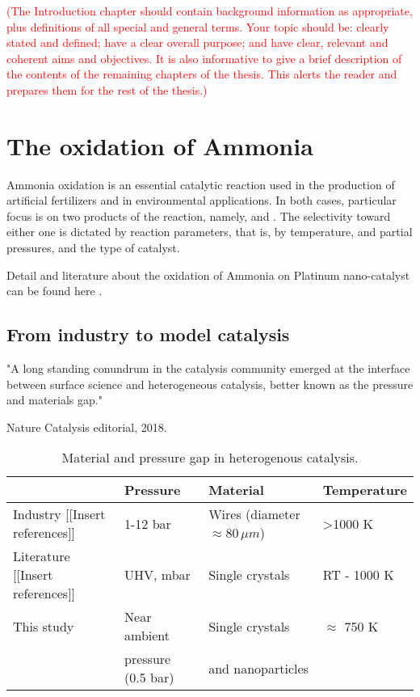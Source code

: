 \textcolor{red}{(The Introduction chapter should contain background information as appropriate, plus definitions of all special and general terms. Your topic should be: clearly stated and defined; have a clear overall purpose; and have clear, relevant and coherent aims and objectives. It is also informative to give a brief description of the contents of the remaining chapters of the thesis. This alerts the reader and prepares them for the rest of the thesis.)}

\section{The oxidation of Ammonia}

Ammonia oxidation is an essential catalytic reaction used in the production of artificial fertilizers and in environmental applications. In both cases, particular focus is on two products of the reaction, namely, \nitricoxide and \nitrogen. The selectivity toward either one is dictated by reaction parameters, that is, by temperature, \ammonia and \dioxygen partial pressures, and the type of catalyst.

Detail and literature about the oxidation of Ammonia on Platinum nano-catalyst can be found here \parencite{Resta2020a}.

\subsection{From industry to model catalysis}

"A long standing conundrum in the catalysis community emerged at the interface between surface science and heterogeneous catalysis, better known as the pressure and materials gap."

Nature Catalysis editorial, 2018.

\begin{table}[!htb]
    \centering
    \begin{tabular}{l|l|l|l}
    \toprule
                & Pressure    & Material       &     Temperature \\
    \midrule
    Industry {\color{DarkOrange}[[Insert references]]}  & 1-12 bar & Wires (diameter $\approx 80 \, \mu m$) & \textgreater 1000 K \\
    \midrule
    Literature {\color{DarkOrange}[[Insert references]]} & UHV, mbar & Single crystals & RT - 1000 K \\ \midrule
    This study & Near ambient    & Single crystals  & $\approx$ 750 K \\
               & pressure (0.5 bar)  & and nanoparticles & \\
    \bottomrule
    \end{tabular}
    \caption{Material and pressure gap in heterogenous catalysis.}
    \label{tab:gap}
\end{table}

